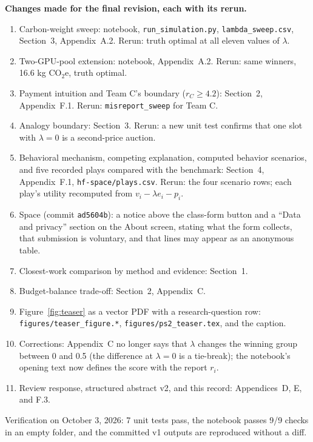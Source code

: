\textbf{Changes made for the final revision, each with its rerun.}
{\sloppy
\begin{enumerate}
\item Carbon-weight sweep: notebook, \texttt{run\_simulation.py}, \texttt{lambda\_sweep.csv}, Section~3, Appendix~A.2. Rerun: truth optimal at all eleven values of $\lambda$.
\item Two-GPU-pool extension: notebook, Appendix~A.2. Rerun: same winners, 16.6 kg CO$_2$e, truth optimal.
\item Payment intuition and Team C's boundary ($r_C\ge4.2$): Section~2, Appendix~F.1. Rerun: \texttt{misreport\_sweep} for Team C.
\item Analogy boundary: Section~3. Rerun: a new unit test confirms that one slot with $\lambda=0$ is a second-price auction.
\item Behavioral mechanism, competing explanation, computed behavior scenarios, and five recorded plays compared with the benchmark: Section~4, Appendix~F.1, \texttt{hf-space/plays.csv}. Rerun: the four scenario rows; each play's utility recomputed from $v_i-\lambda e_i-p_i$.
\item Space (commit \texttt{ad5604b}): a notice above the class-form button and a ``Data and privacy'' section on the About screen, stating what the form collects, that submission is voluntary, and that lines may appear as an anonymous table.
\item Closest-work comparison by method and evidence: Section~1.
\item Budget-balance trade-off: Section~2, Appendix~C.
\item Figure~\ref{fig:teaser} as a vector PDF with a research-question row: \texttt{figures/teaser\_figure.*}, \texttt{figures/ps2\_teaser.tex}, and the caption.
\item Corrections: Appendix~C no longer says that $\lambda$ changes the winning group between 0 and 0.5 (the difference at $\lambda=0$ is a tie-break); the notebook's opening text now defines the score with the report $r_i$.
\item Review response, structured abstract v2, and this record: Appendices~D, E, and F.3.
\end{enumerate}}
Verification on October 3, 2026: 7 unit tests pass, the notebook passes 9/9 checks in an empty folder, and the committed v1 outputs are reproduced without a diff.
